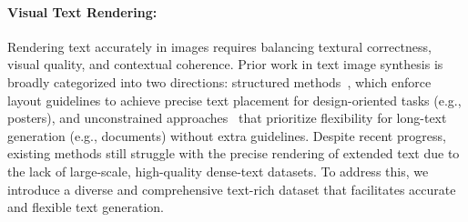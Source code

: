 \paragraph{Visual Text Rendering:}
Rendering text accurately in images requires balancing textural correctness, visual quality, and contextual coherence. 
Prior work in text image synthesis is broadly categorized into two directions: structured methods~\cite{anytext,glyphcontrol,glyphdraw,textdiffuser,pixart,ca_aware}, which enforce layout guidelines to achieve precise text placement for design-oriented tasks (e.g., posters), and unconstrained approaches~\cite{dnd_transformer} that prioritize flexibility for long-text generation (e.g., documents) without extra guidelines.
Despite recent progress, existing methods still struggle with the precise rendering of extended text due to the lack of large-scale, high-quality dense-text datasets. To address this, we introduce a diverse and comprehensive text-rich dataset that facilitates accurate and flexible text generation.

